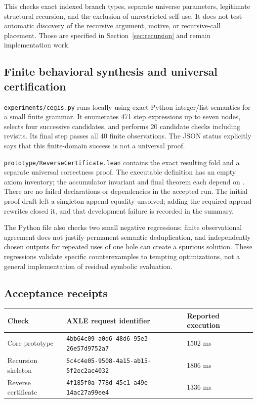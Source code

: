 \documentclass[11pt,letterpaper]{article}
\newcommand{\id}[1]{\texttt{\detokenize{#1}}}
\newcommand{\pathref}[1]{\nolinkurl{#1}}
\theoremstyle{definition}
\theoremstyle{remark}
\begin{document}
This checks exact indexed branch types, separate universe parameters, legitimate structural recursion, and the exclusion of unrestricted self-use. It does not test automatic discovery of the recursive argument, motive, or recursive-call placement. Those are specified in Section~\ref{sec:recursion} and remain implementation work.

\subsection{Finite behavioral synthesis and universal certification}

\pathref{experiments/cegis.py} runs locally using exact Python integer/list semantics for a small finite grammar. It enumerates 471 step expressions up to seven nodes, selects four successive candidates, and performs 20 candidate checks including revisits. Its final step \id{[x] ++ acc} passes all 40 finite observations. The JSON status explicitly says that this finite-domain success is not a universal proof.

\pathref{prototype/ReverseCertificate.lean} contains the exact resulting fold and a separate universal correctness proof. The executable definition has an empty axiom inventory; the accumulator invariant and final theorem each depend on \id{propext}. There are no failed declarations or \id{sorryAx} dependencies in the accepted run. The initial proof draft left a singleton-append equality unsolved; adding the required append rewrites closed it, and that development failure is recorded in the summary.

The Python file also checks two small negative regressions: finite observational agreement does not justify permanent semantic deduplication, and independently chosen outputs for repeated uses of one hole can create a spurious solution. These regressions validate specific counterexamples to tempting optimizations, not a general implementation of residual symbolic evaluation.

\subsection{Acceptance receipts}

\begin{longtable}{@{}L{0.24\textwidth}L{0.53\textwidth}L{0.15\textwidth}@{}}
\toprule
Check & AXLE request identifier & Reported execution \\
\midrule
\endhead
Core prototype & \pathref{4bb64c09-a0d6-48d6-95e3-26e57d9752a7} & 1502 ms \\
Recursion skeleton & \pathref{5c4c4e05-9508-4a15-ab15-5f2ec2ac4032} & 1806 ms \\
Reverse certificate & \pathref{4f185f0a-778d-45c1-a49e-14ac27a99ee4} & 1336 ms \\
\bottomrule
\end{longtable}
\end{document}
